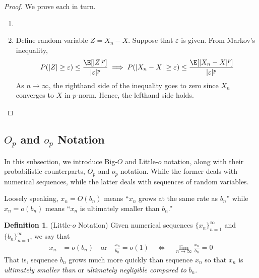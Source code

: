 \documentclass[12pt]{article}
\theoremstyle{plain}
\theoremstyle{definition}
\newtheorem{defn}[thm]{Definition}
\theoremstyle{remark}
\newcommand{\ra}{\rightarrow}
\newcommand{\asto}{\xrightarrow{a.s.}}
\newcommand{\limn}{\lim_{n\rightarrow\infty}}
\begin{document}
\begin{proof}
We prove each in turn.
\begin{enumerate}
  \item

  \item Define random variable $Z=X_n-X$. Suppose that $\varepsilon$ is
    given. From Markov's inequality,
    \begin{align*}
      P(|Z| \geq \varepsilon) \leq \frac{\E[|Z|^p]}{|\varepsilon|^p}
      \implies
      P(|X_n-X| \geq \varepsilon) \leq \frac{\E[|X_n-X|^p]}{|\varepsilon|^p}
    \end{align*}
    As $n\ra\infty$, the righthand side of the inequality goes to zero
    since $X_n$ converges to $X$ in $p$-norm. Hence, the lefthand side
    holds.
\end{enumerate}
\end{proof}

\clearpage
\subsection{$O_p$ and $o_p$ Notation}

In this subsection, we introduce Big-$O$ and Little-$o$ notation, along
with their probabilistic counterparts, $O_p$ and $o_p$ notation. While
the former deals with numerical sequences, while the latter deals with
sequences of random variables.

Loosely speaking, $x_n = O(b_n)$ means ``$x_n$ grows at the same
rate as $b_n$'' while $x_n=o(b_n)$ means ``$x_n$ is ultimately smaller
than $b_n$.''


\begin{defn}(Little-$o$ Notation)
Given numerical sequences $\{x_n\}_{n=1}^\infty$ and
$\{b_n\}_{n=1}^\infty$, we say that
\begin{align*}
  x_n &= o(b_n)
  \quad\text{or} \quad
  \frac{x_n}{b_n} = o(1)
  \quad \iff \quad
  \limn \frac{x_n}{b_n} = 0
\end{align*}
That is, sequence $b_n$ grows much more quickly than sequence $x_n$ so
that $x_n$ is \emph{ultimately smaller than} or
\emph{ultimately negligible compared to} $b_n$.
\end{defn}
\end{document}
